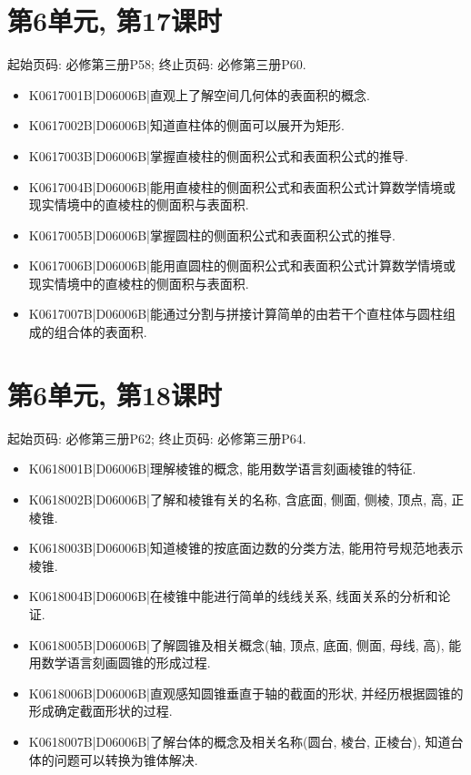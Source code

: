 \section*{第6单元, 第17课时}
起始页码: 必修第三册P58; 终止页码: 必修第三册P60.
\begin{itemize}
\item K0617001B|D06006B|直观上了解空间几何体的表面积的概念.
\item K0617002B|D06006B|知道直柱体的侧面可以展开为矩形.
\item K0617003B|D06006B|掌握直棱柱的侧面积公式和表面积公式的推导.
\item K0617004B|D06006B|能用直棱柱的侧面积公式和表面积公式计算数学情境或现实情境中的直棱柱的侧面积与表面积.
\item K0617005B|D06006B|掌握圆柱的侧面积公式和表面积公式的推导.
\item K0617006B|D06006B|能用直圆柱的侧面积公式和表面积公式计算数学情境或现实情境中的直棱柱的侧面积与表面积.
\item K0617007B|D06006B|能通过分割与拼接计算简单的由若干个直柱体与圆柱组成的组合体的表面积.
\end{itemize}

\section*{第6单元, 第18课时}
起始页码: 必修第三册P62; 终止页码: 必修第三册P64.
\begin{itemize}
\item K0618001B|D06006B|理解棱锥的概念, 能用数学语言刻画棱锥的特征.
\item K0618002B|D06006B|了解和棱锥有关的名称, 含底面, 侧面, 侧棱, 顶点, 高, 正棱锥.
\item K0618003B|D06006B|知道棱锥的按底面边数的分类方法, 能用符号规范地表示棱锥.
\item K0618004B|D06006B|在棱锥中能进行简单的线线关系, 线面关系的分析和论证.
\item K0618005B|D06006B|了解圆锥及相关概念(轴, 顶点, 底面, 侧面, 母线, 高), 能用数学语言刻画圆锥的形成过程.
\item K0618006B|D06006B|直观感知圆锥垂直于轴的截面的形状, 并经历根据圆锥的形成确定截面形状的过程.
\item K0618007B|D06006B|了解台体的概念及相关名称(圆台, 棱台, 正棱台), 知道台体的问题可以转换为锥体解决.
\end{itemize}

